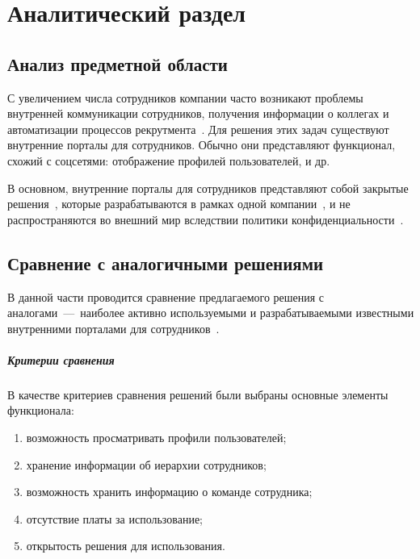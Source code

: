 \chapter{Аналитический раздел}

\section{Анализ предметной области}
С увеличением числа сотрудников компании часто возникают проблемы внутренней коммуникации сотрудников, получения информации о коллегах и автоматизации процессов рекрутмента~\cite{intranet_avito}. Для решения этих задач существуют внутренние порталы для сотрудников. Обычно они представляют функционал, схожий с соцсетями: отображение профилей пользователей, и др. 

В основном, внутренние порталы для сотрудников представляют собой закрытые решения~\cite{глухих2005глухих}, которые разрабатываются в рамках одной компании~\cite{rivelty}, и не распространяются во внешний мир вследствии политики конфиденциальности~\cite{klee2000importance}. 



\section{Сравнение с аналогичными решениями}
В данной части проводится сравнение предлагаемого решения с аналогами~---~наиболее активно используемыми и разрабатываемыми известными внутренними порталами для сотрудников~\cite{rivelty}.

\paragraph{Критерии сравнения} \mbox{}

В качестве критериев сравнения решений были выбраны основные элементы функционала:

\begin{enumerate}
	\item возможность просматривать профили пользователей;
	\item хранение информации об иерархии сотрудников;
	\item возможность хранить информацию о команде сотрудника;
	\item отсутствие платы за использование;
	\item открытость решения для использования.
\end{enumerate}


